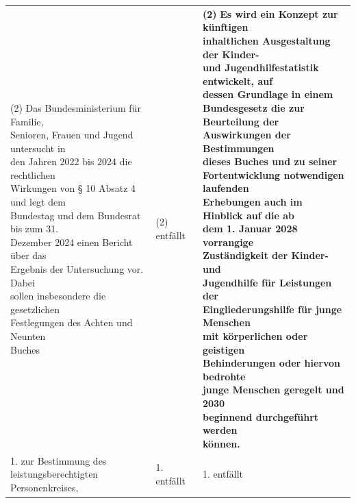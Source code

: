 \documentclass[10pt,a4paper,landscape]{article}
\begin{document}
\begin{longtable}{|L{8.2cm}|L{8.2cm}|L{8.2cm}|}
(2) \textcolor{diffred}{Das Bundesministerium} für \textcolor{diffred}{Familie,  \newline Senioren, Frauen} und \textcolor{diffred}{Jugend untersucht in  \newline den Jahren 2022 bis 2024 die rechtlichen  \newline Wirkungen von \S{} 10 Absatz 4 und legt dem  \newline Bundestag und dem Bundesrat bis zum 31.  \newline Dezember 2024 einen Bericht über das  \newline Ergebnis der Untersuchung vor. Dabei  \newline sollen insbesondere die gesetzlichen  \newline Festlegungen des Achten und Neunten  \newline Buches} & (2) \textcolor{diffred}{entfällt} & \textbf{(2) }\textbf{\textcolor{diffgreen}{Es wird ein Konzept zur künftigen  \newline inhaltlichen Ausgestaltung der Kinder-  \newline und Jugendhilfestatistik entwickelt, auf  \newline dessen Grundlage in einem  \newline Bundesgesetz die zur Beurteilung der  \newline Auswirkungen der Bestimmungen  \newline dieses Buches und zu seiner  \newline Fortentwicklung notwendigen laufenden  \newline Erhebungen auch im Hinblick auf die ab  \newline dem 1. Januar 2028 vorrangige  \newline Zuständigkeit der Kinder- und  \newline Jugendhilfe für Leistungen der  \newline Eingliederungshilfe für junge Menschen  \newline mit körperlichen oder geistigen  \newline Behinderungen oder hiervon bedrohte  \newline junge Menschen geregelt und 2030  \newline beginnend durchgeführt werden  \newline können.}} \\
\hhline{|---|}
1.   \newline \textcolor{diffred}{zur Bestimmung des leistungsberechtigten  \newline Personenkreises,} & 1. entfällt & 1. entfällt \\

\end{longtable}
\end{document}
